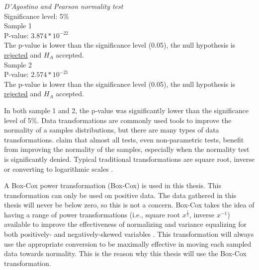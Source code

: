 \begin{center}
	\begin{tcolorbox}[width=0.80\textwidth]
		\centering
				\textit{D'Agostino and Pearson normality test}\\
				Significance level: 5\%  \\[0.5cm]
	
				Sample 1\\
				P-value: $3.874 * 10^{-22}$\\
				The p-value is lower than the significance level (0.05), the null hypothesis is \underline{rejected} and $H_A$ accepted.\\[0.5cm]
				
				Sample 2\\
				P-value: $2.574 * 10^{-21}$ \\
				The p-value is lower than the significance level (0.05), the null hypothesis is \underline{rejected} and $H_A$ accepted.\\[0.5cm]
	\end{tcolorbox} 
\end{center}
In both sample 1 and 2, the p-value was significantly lower than the significance level of 5\%. Data transformations are commonly used tools to improve the normality of a samples distributions, but there are many types of data transformations. \cite{Osborne2010} claim that almost all tests, even non-parametric tests, benefit from improving the normality of the samples, especially when the normality test is significantly denied. Typical traditional transformations are square root, inverse or converting to logarithmic scales  \citep{Osborne2010}. 

A Box-Cox power transformation (Box-Cox) is used in this thesis. This transformation can only be used on positive data. The data gathered in this thesis will never be below zero, so this is not a concern. Box-Cox takes the idea of having a range of power transformations (i.e., square root $x^{\frac{1}{2}}$, inverse $x^{-1}$) available to improve the effectiveness of normalizing and variance equalizing for both positively- and negatively-skewed variables \citep{Osborne2010}. This transformation will always use the appropriate conversion to be maximally effective in moving each sampled data towards normality. This is the reason why this thesis will use the Box-Cox transformation.

